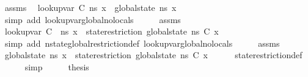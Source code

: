 \begin{isabellebody}
\ assms\ \isamarkupfalse%
\ {\isachardoublequoteopen}lookup{\isacharunderscore}{\kern0pt}var\ {\isacharparenleft}{\kern0pt}C{\isacharcomma}{\kern0pt}{\isacharbrackleft}{\kern0pt}{\isacharbrackright}{\kern0pt}{\isacharparenright}{\kern0pt}\ ns\ x\ {\isacharequal}{\kern0pt}\ global{\isacharunderscore}{\kern0pt}state\ ns\ x{\isachardoublequoteclose}\isanewline
\ \ \ \ \isamarkupfalse%
\ {\isacharparenleft}{\kern0pt}simp\ add{\isacharcolon}{\kern0pt}\ lookup{\isacharunderscore}{\kern0pt}var{\isacharunderscore}{\kern0pt}global{\isacharunderscore}{\kern0pt}no{\isacharunderscore}{\kern0pt}locals{\isacharparenright}{\kern0pt}\isanewline
\ \ \isamarkupfalse%
\ \isamarkupfalse%
\ assms\ \isamarkupfalse%
\ {\isachardoublequoteopen}lookup{\isacharunderscore}{\kern0pt}var\ {\isacharparenleft}{\kern0pt}C{\isacharcomma}{\kern0pt}\ {\isacharbrackleft}{\kern0pt}{\isacharbrackright}{\kern0pt}{\isacharparenright}{\kern0pt}\ {\isacharquery}{\kern0pt}ns{\isacharprime}{\kern0pt}\ x\ {\isacharequal}{\kern0pt}\ {\isacharparenleft}{\kern0pt}state{\isacharunderscore}{\kern0pt}restriction\ {\isacharparenleft}{\kern0pt}global{\isacharunderscore}{\kern0pt}state\ ns{\isacharparenright}{\kern0pt}\ C{\isacharparenright}{\kern0pt}\ x{\isachardoublequoteclose}\isanewline
\ \ \ \ \isamarkupfalse%
\ {\isacharparenleft}{\kern0pt}simp\ add{\isacharcolon}{\kern0pt}\ nstate{\isacharunderscore}{\kern0pt}global{\isacharunderscore}{\kern0pt}restriction{\isacharunderscore}{\kern0pt}def\ lookup{\isacharunderscore}{\kern0pt}var{\isacharunderscore}{\kern0pt}global{\isacharunderscore}{\kern0pt}no{\isacharunderscore}{\kern0pt}locals{\isacharparenright}{\kern0pt}\isanewline
\isanewline
\ \ \isamarkupfalse%
\ \isamarkupfalse%
\ assms\ \isamarkupfalse%
\ {\isachardoublequoteopen}global{\isacharunderscore}{\kern0pt}state\ ns\ x\ {\isacharequal}{\kern0pt}\ {\isacharparenleft}{\kern0pt}state{\isacharunderscore}{\kern0pt}restriction\ {\isacharparenleft}{\kern0pt}global{\isacharunderscore}{\kern0pt}state\ ns{\isacharparenright}{\kern0pt}\ C{\isacharparenright}{\kern0pt}\ x{\isachardoublequoteclose}\isanewline
\ \ \ \ \isamarkupfalse%
\ state{\isacharunderscore}{\kern0pt}restriction{\isacharunderscore}{\kern0pt}def\isanewline
\ \ \ \ \isamarkupfalse%
\ simp\isanewline
\ \ \isamarkupfalse%
\ \isamarkupfalse%
\ {\isacharquery}{\kern0pt}thesis\isanewline

\end{isabellebody}
